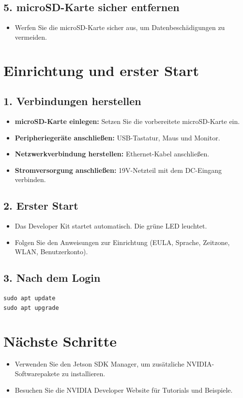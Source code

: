 \documentclass{article}
\begin{document}
\subsection{5. microSD-Karte sicher entfernen}
\begin{itemize}
    \item Werfen Sie die microSD-Karte sicher aus, um Datenbeschädigungen zu vermeiden.
\end{itemize}

\newpage
\section{Einrichtung und erster Start}

\subsection{1. Verbindungen herstellen}
\begin{itemize}
    \item \textbf{microSD-Karte einlegen:} Setzen Sie die vorbereitete microSD-Karte ein.
    \item \textbf{Peripheriegeräte anschließen:} USB-Tastatur, Maus und Monitor.
    \item \textbf{Netzwerkverbindung herstellen:} Ethernet-Kabel anschließen.
    \item \textbf{Stromversorgung anschließen:} 19V-Netzteil mit dem DC-Eingang verbinden.
\end{itemize}

\subsection{2. Erster Start}
\begin{itemize}
    \item Das Developer Kit startet automatisch. Die grüne LED leuchtet.
    \item Folgen Sie den Anweisungen zur Einrichtung (EULA, Sprache, Zeitzone, WLAN, Benutzerkonto).
\end{itemize}

\subsection{3. Nach dem Login}
\begin{verbatim}
sudo apt update
sudo apt upgrade
\end{verbatim}

\section{Nächste Schritte}
\begin{itemize}
    \item Verwenden Sie den Jetson SDK Manager, um zusätzliche NVIDIA-Softwarepakete zu installieren.
    \item Besuchen Sie die NVIDIA Developer Website für Tutorials und Beispiele.
\end{itemize}
\end{document}
